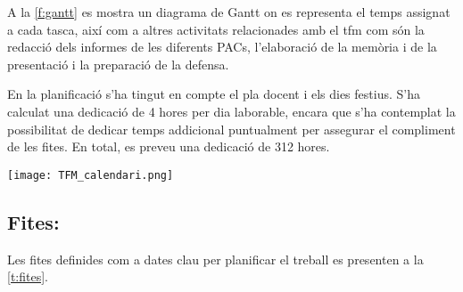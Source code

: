 \documentclass[CAT,BIB]{TFUOC}%
\begin{document}
            A la \cref{f:gantt} es mostra un diagrama de Gantt
            on es representa el temps assignat a cada tasca,
            així com a altres activitats relacionades amb el \gls{tfm}
            com són la redacció dels informes de les diferents PACs,
            l'elaboració de la memòria i de la presentació
            i la preparació de la defensa.

            En la planificació
            s'ha tingut en compte el pla docent i els dies festius.
            S'ha calculat una dedicació de 4 hores per dia laborable,
            encara que s'ha contemplat la possibilitat de dedicar temps addicional puntualment
            per assegurar el compliment de les fites.
            En total, es preveu una dedicació de 312 hores.

            \begin{sidewaysfigure}[p]
                \centering
                \texttt{[image: TFM\_calendari.png]}
                \caption[Calendari: diagrama de Gantt]{Diagrama de Gantt:
                planificació dels objectius i tasques.}
                \label{f:gantt}
            \end{sidewaysfigure}

        \subsection{Fites:}
        \label{sec:fites}

            Les fites definides
            com a dates clau per planificar el treball
            es presenten a la \cref{t:fites}.
\end{document}
